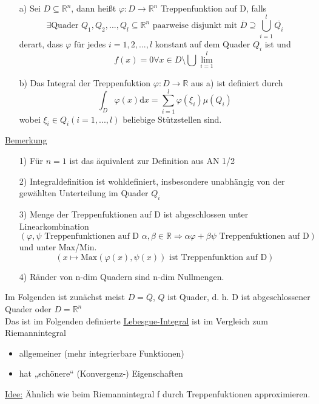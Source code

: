 \begin{definition}[Treppenfunktion]\leavevmode
\begin{itemize}
	\item[a)] Sei $D \subseteq \mathbb{R}^n$, dann heißt $\varphi :D \to \mathbb{R}^n$ Treppenfunktion auf D, falls
		\[ \exists \text{Quader } Q_1, Q_2, ..., Q_l \subseteq \mathbb{R}^n \text{ paarweise disjunkt mit } \overline{D} \supseteq \bigcup_{i=1}^l \overline{Q_i}\]
		derart, dass $\varphi$ für jedes $i = 1,2,...,l$ konstant auf dem Quader $Q_i$ ist und \[f(x) = 0 \forall x \in D\setminus \bigcup\lim_{i=1}^l\]
	\item[b)] Das Integral der Treppenfuktion $\varphi\colon D \to \mathbb{R}$ aus a) ist definiert durch
		\[ \int_D \varphi(x) \text{d}x = \sum_{i=1}^l \varphi(\xi_i) \mu(Q_i)\]
		wobei $\xi_i \in Q_i (i=1,...,l)$ beliebige Stützstellen sind. 
\end{itemize}
\end{definition}

\underline{Bemerkung}
\begin{itemize}
	\item[1)] Für $n=1$ ist das äquivalent zur Definition aus AN 1/2
	\item[2)] Integraldefinition ist wohldefiniert, insbesondere unabhängig von der gewählten Unterteilung im Quader $Q_i$
	\item[3)] Menge der Treppenfuktionen auf D ist abgeschlossen unter Linearkombination
	\[(\varphi, \psi \text{ Treppenfunktionen auf D } \alpha, \beta \in \mathbb{R} \Rightarrow \alpha\varphi + \beta\psi \text{ Treppenfuktionen auf D})\]
	und unter Max/Min.
	\[(x \mapsto \text{Max} (\varphi(x), \psi(x)) \text{ ist Treppenfunktion auf D})\]
	\item[4)] Ränder von n-dim Quadern sind n-dim Nullmengen.
\end{itemize}
Im Folgenden ist zunächst meist $D=\overline{Q}$, $Q$ ist Quader, d. h. D ist abgeschlossener Quader oder $D=\mathbb{R}^n$\\
Das ist im Folgenden definierte \underline{Lebesgue-Integral} ist im Vergleich zum Riemannintegral
\begin{itemize}
	\item allgemeiner (mehr integrierbare Funktionen)
	\item hat „schönere“ (Konvergenz-) Eigenschaften
\end{itemize} 

\underline{Idee:} Ähnlich wie beim Riemannintegral f durch Treppenfuktionen approximieren.\\


